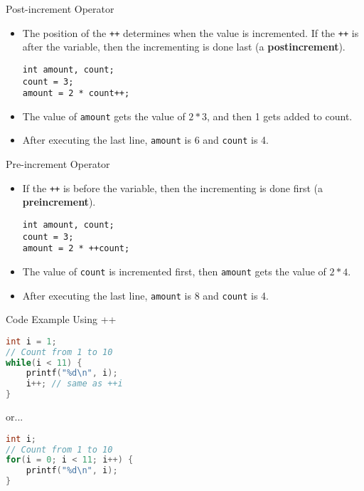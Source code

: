 \documentclass[graphics]{beamer}
\begin{document}
\begin{frame}[fragile]{Post-increment Operator}
    \begin{itemize}
        \item The position of the \texttt{++} determines when the value is incremented. If the \texttt{++} is after the variable, then the incrementing is done last (a \textbf{postincrement}).
        \begin{verbatim}
int amount, count;
count = 3;
amount = 2 * count++;
        \end{verbatim}
        \item The value of \texttt{amount} gets the value of $2 * 3$, and then 1 gets added to count.
        \item After executing the last line, \texttt{amount} is 6 and \texttt{count} is 4.
    \end{itemize}
\end{frame}

\begin{frame}[fragile]{Pre-increment Operator}
    \begin{itemize}
        \item If the \texttt{++} is before the variable, then the incrementing is done first (a \textbf{preincrement}).
        \begin{verbatim}
int amount, count;
count = 3;
amount = 2 * ++count;
        \end{verbatim}
        \item The value of \texttt{count} is incremented first, then \texttt{amount} gets the value of $2 * 4$.
        \item After executing the last line, \texttt{amount} is 8 and \texttt{count} is 4.
    \end{itemize}
\end{frame}

\begin{frame}[fragile]{Code Example Using ++}
    \begin{lstlisting}[language=C,basicstyle=\footnotesize,keywordstyle=\color{blue},commentstyle=\color{green},showstringspaces=false,stringstyle=\color{red}]
int i = 1;
// Count from 1 to 10
while(i < 11) {
    printf("%d\n", i);
    i++; // same as ++i
}
\end{lstlisting}
or...
    \begin{lstlisting}[language=C,basicstyle=\footnotesize,keywordstyle=\color{blue},commentstyle=\color{green},showstringspaces=false,stringstyle=\color{red}]
int i;
// Count from 1 to 10
for(i = 0; i < 11; i++) {
    printf("%d\n", i);
}
\end{lstlisting}
\end{frame}
\end{document}
